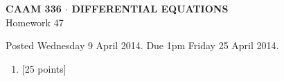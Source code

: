 \documentclass[10pt]{article}
\begin{document}
\vspace*{-5em}
\begin{center}
\large \textsf{\textbf{CAAM 336 $\cdot$ DIFFERENTIAL EQUATIONS}\\[0.5em]
Homework 47 }
\end{center}

Posted Wednesday 9 April 2014.  Due 1pm Friday 25 April 2014.

\begin{enumerate}\addtocounter{enumi}{46}
\item {[25 points]}  
\end{enumerate}
\end{document}
